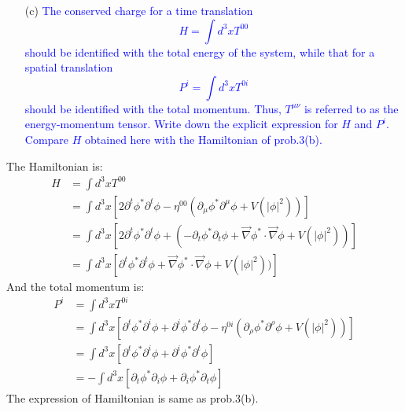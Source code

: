 \documentclass[11pt, a4paper]{article}
\begin{document}
\newpage

\begin{enumerate}
    \item [(c)] \textcolor{blue}{
    The conserved charge for a time translation
    \begin{equation}\label{eqn:4.3}
        H = \int d^3x T^{00}
    \end{equation}
    should be identified with the total energy of the system, while that for a spatial translation
    \begin{equation}\label{eqn:4.4}
        P^i = \int d^3x T^{0i}
    \end{equation}
    should be identified with the total momentum. Thus, $T^{\mu\nu}$ is referred to as the energy-momentum tensor. Write down the explicit expression for $H$ and $P^i$. Compare $H$ obtained here with the Hamiltonian of prob.3(b).
    }
\end{enumerate}
The Hamiltonian is:
\begin{align}
    H & = \int d^3x T^{00} \\
    & = \int d^3x \left[ 2\partial^t \phi^* \partial^t \phi - \eta^{00}(\partial_\mu \phi^* \partial^\mu \phi + V(|\phi|^2)) \right] \\
    & = \int d^3x \left[ 2\partial^t \phi^* \partial^t \phi + (-\partial_t \phi^* \partial_t \phi + \vec{\nabla}\phi^* \cdot \vec{\nabla}\phi + V(|\phi|^2)) \right] \\
    & =\int d^3x \left[ \partial^t \phi^* \partial^t \phi + \vec{\nabla}\phi^* \cdot \vec{\nabla}\phi + V(|\phi|^2)) \right]
\end{align}
And the total momentum is:
\begin{align}
    P^{i} & = \int d^3x T^{0i} \\
    & = \int d^3x \left[ \partial^t \phi^* \partial^i \phi + \partial^i\phi^* \partial^t\phi - \eta^{0i}(\partial_\rho \phi^* \partial^\rho \phi + V(|\phi|^2) ) \right] \\
    & = \int d^3x \left[ \partial^t \phi^* \partial^i \phi + \partial^i\phi^* \partial^t\phi \right] \\
    & = - \int d^3x \left[ \partial_t \phi^* \partial_i \phi + \partial_i\phi^* \partial_t\phi \right]
\end{align}
The expression of Hamiltonian is same as prob.3(b).
\end{document}

